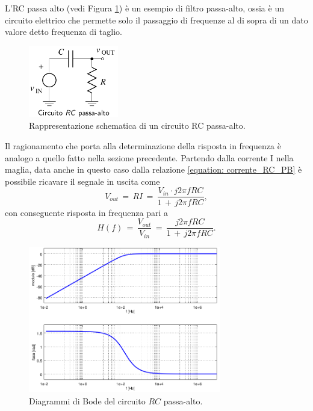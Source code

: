 L'RC passa alto (vedi Figura \ref{figure: RC_PassaAlto}) è un esempio di filtro passa-alto, ossia è un circuito elettrico che
permette solo il passaggio di frequenze al di sopra di un dato valore detto frequenza di taglio.
\begin{figure}[H]
    \centering
    \includegraphics[width=0.35\textwidth]{Immagini/RC_PassaAlto.png}
    \caption{Rappresentazione schematica di un circuito RC passa-alto.}
    \label{figure: RC_PassaAlto}
\end{figure}
Il ragionamento che porta alla determinazione della risposta in frequenza è analogo a quello fatto nella sezione precedente.
Partendo dalla corrente I nella maglia, data anche in questo caso dalla relazione \eqref{equation: corrente_RC_PB} è possibile
ricavare il segnale in uscita come
\begin{equation}
    V_{out}\,=\,RI\,=\,\frac{V_{in} \cdot j2\pi fRC}{1\,+\,j2\pi fRC},
    \label{equation: Vout_RC_PA}
\end{equation}
con conseguente risposta in frequenza pari a
\begin{equation}
    H\left(f\right)\,=\,\frac{V_{out}}{V_{in}}\,=\,\frac{j2\pi fRC}{1\,+\,j2\pi fRC}.
    \label{equation: Risposta_RC_PA}
\end{equation}
\begin{figure}[H]
    \centering
    \includegraphics[width=0.75\textwidth]{Immagini/DiagrammiBodePassaAlto.png}
    \caption{Diagrammi di Bode del circuito $RC$ passa-alto.}
    \label{figure: DiagrammiBodePassaAlto}
\end{figure}

